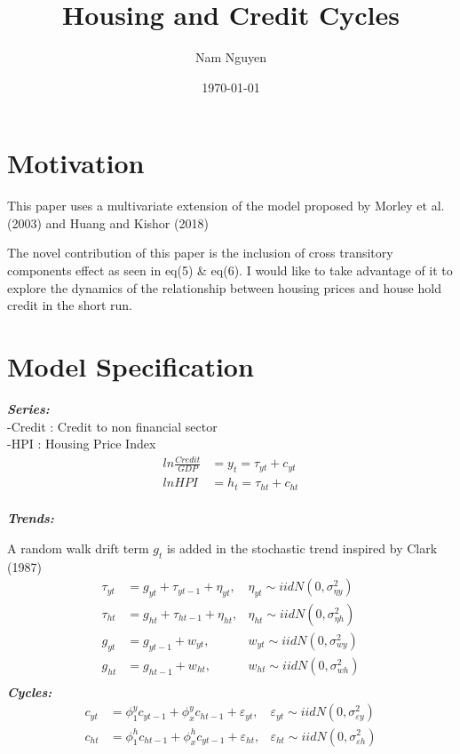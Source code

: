\documentclass[fleqn]{article}
\title{Housing and Credit Cycles}
\author{Nam Nguyen}
\date{\today}
\begin{document}
	\maketitle
	
\begin{outline}[enumerate]

\section{Motivation}

This paper uses a multivariate extension of the model proposed by Morley et al. (2003) and Huang and Kishor (2018)

The novel contribution of this paper is the inclusion of cross transitory components effect as seen in eq(5) \& eq(6). I would like to take advantage of it to explore the dynamics of the relationship between housing prices and house hold credit in the short run.
		
\section {Model Specification}

\textbf{\textit{Series:}} \\
-Credit : Credit to non financial sector\\
-HPI : Housing Price Index
	\begin{align}
	ln \frac{Credit}{GDP} &= y_t = \tau_{yt} + c_{yt}
	\\
	ln HPI &= h_t = \tau_{ht} + c_{ht}
	\end{align}
	\\
\textbf{\textit{Trends:}}


A random walk drift term $g_t$ is added in the stochastic trend inspired by Clark (1987)
	\begin{align}
	\tau_{yt} &= g_{yt} + \tau_{yt-1} + \eta_{yt}, &\eta_{yt} \sim iidN(0,\sigma^2_{\eta y})
	\\
	\tau_{ht} &= g_{ht} + \tau_{ht-1} + \eta_{ht}, &\eta_{ht} \sim iidN(0,\sigma^2_{\eta h})	
	\\
	g_{yt} &= g_{yt-1} + w_{yt}, &w_{yt} \sim iidN(0,\sigma^2_{w y})
	\\
	g_{ht} &= g_{ht-1} + w_{ht}, &w_{ht} \sim iidN(0,\sigma^2_{w h})
	\\
	\end{align}
\textbf{\textit{Cycles:}}
	\begin{align}
	c_{yt} &= \phi^y_{1}c_{yt-1}  
		   + \phi^y_{x}c_{ht-1} 
		   + \varepsilon_{yt},
		   &\varepsilon_{yt} \sim iidN(0,\sigma^2_{\varepsilon y})		   
	\\
	c_{ht} &= \phi^h_{1}c_{ht-1}  
		   + \phi^h_{x}c_{yt-1}  
	   	   + \varepsilon_{ht},
	   	   	&\varepsilon_{ht} \sim iidN(0,\sigma^2_{\varepsilon h})
	\end{align}



\end{outline}
\end{document}
